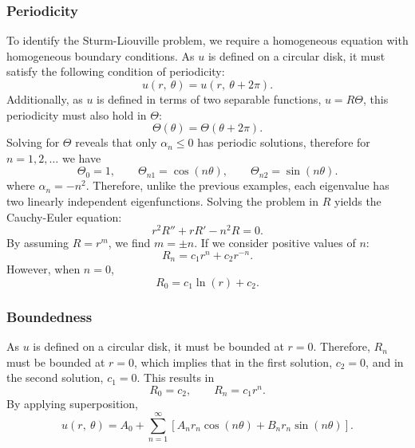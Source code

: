 \documentclass{article}
\begin{document}
\subsubsection{Periodicity}
To identify the Sturm-Liouville problem, we require a homogeneous
equation with homogeneous boundary conditions. As \(u\) is defined on a
circular disk, it must satisfy the following condition of periodicity:
\begin{equation*}
    u\left( r,\: \theta \right) = u\left( r,\: \theta + 2\pi \right).
\end{equation*}
Additionally, as \(u\) is defined in terms of two separable functions,
\(u = R \Theta\), this periodicity must also hold in \(\Theta\):
\begin{equation*}
    \Theta\left( \theta \right) = \Theta\left( \theta + 2\pi \right).
\end{equation*}
Solving for \(\Theta\) reveals that only \(\alpha_n \leqslant 0\) has
periodic solutions, therefore for \(n = 1, 2, \ldots\) we have
\begin{equation*}
    \Theta_0 = 1, \quad\quad \Theta_{n1} = \cos{\left( n\theta \right)}, \quad\quad \Theta_{n2} = \sin{\left( n\theta \right)}.
\end{equation*}
where \(\alpha_n = -n^2\). Therefore, unlike the previous examples, each eigenvalue
has two linearly independent eigenfunctions. Solving the problem in \(R\) yields
the Cauchy-Euler equation:
\begin{equation*}
    r^2 R'' + r R' - n^2 R = 0.
\end{equation*}
By assuming \(R = r^m\), we find \(m = \pm n\). If we consider positive values of \(n\):
\begin{equation*}
    R_n = c_1 r^n + c_2 r^{-n}.
\end{equation*}
However, when \(n = 0\),
\begin{equation*}
    R_0 = c_1 \ln{\left( r \right)} + c_2.
\end{equation*}
\subsubsection{Boundedness}
As \(u\) is defined on a circular disk, it must be bounded at \(r =
0\). Therefore, \(R_n\) must be bounded at \(r = 0\), which implies
that in the first solution, \(c_2 = 0\), and in the second solution,
\(c_1 = 0\). This results in
\begin{equation*}
    R_0 = c_2, \quad\quad R_n = c_1 r^n.
\end{equation*}
By applying superposition,
\begin{equation*}
    u\left( r,\: \theta \right) = A_0 + \sum_{n = 1}^\infty \left[ A_n r_n \cos{\left( n \theta \right)} + B_n r_n \sin{\left( n \theta \right)} \right].
\end{equation*}
\end{document}
